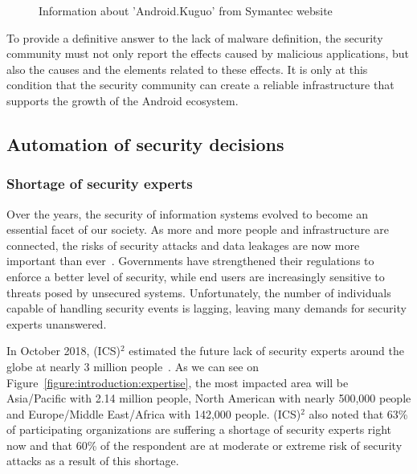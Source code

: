 \begin{figure}[!ht]
	\centering
        \caption[Information about 'Android.Kuguo' from Symantec website]{Information about 'Android.Kuguo' from Symantec website~\cite{symantec_android.kuguo_2019}}
	\label{figure:introduction:symantec}
\end{figure}

To provide a definitive answer to the lack of malware definition, the security community must not only report the effects caused by malicious applications, but also the causes and the elements related to these effects.
It is only at this condition that the security community can create a reliable infrastructure that supports the growth of the Android ecosystem.
\subsection{Automation of security decisions}
\subsubsection{Shortage of security experts}
Over the years, the security of information systems evolved to become an essential facet of our society.
As more and more people and infrastructure are connected, the risks of security attacks and data leakages are now more important than ever~\cite{leskin_21_2018}.
Governments have strengthened their regulations to enforce a better level of security, while end users are increasingly sensitive to threats posed by unsecured systems.
Unfortunately, the number of individuals capable of handling security events is lagging, leaving many demands for security experts unanswered.

In October 2018, (ICS)$^2$ estimated the future lack of security experts around the globe at nearly 3 million people~\cite{ics2_cybersecurity_2018}.
As we can see on Figure~\ref{figure:introduction:expertise}, the most impacted area will be Asia/Pacific with 2.14 million people, North American with nearly 500,000 people and Europe/Middle East/Africa with 142,000 people.
(ICS)$^2$ also noted that 63\% of participating organizations are suffering a shortage of security experts right now and that 60\% of the respondent are at moderate or extreme risk of security attacks as a result of this shortage.

